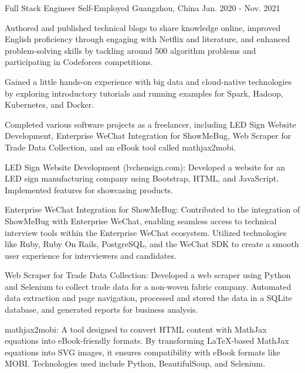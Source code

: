 \begin{cventries}
\cventry
{Full Stack Engineer} %
{Self-Employed} %
{Guangzhou, China} %
{Jan. 2020 - Nov. 2021} %
{
  \begin{cvitems} %
    \item {Authored and published technical blogs to share knowledge online, improved English proficiency through engaging with Netflix and literature, and enhanced problem-solving skills by tackling around 500 algorithm problems and participating in Codeforces competitions.}
    \item {Gained a little hands-on experience with big data and cloud-native technologies by exploring introductory tutorials and running examples for Spark, Hadoop, Kubernetes, and Docker.}
    \item {Completed various software projects as a freelancer, including LED Sign Website Development, Enterprise WeChat Integration for ShowMeBug, Web Scraper for Trade Data Collection, and an eBook tool called mathjax2mobi.}
    \item {LED Sign Website Development (lvchensign.com): Developed a website for an LED sign manufacturing company using Bootstrap, HTML, and JavaScript. Implemented features for showcasing products.}
    \item {Enterprise WeChat Integration for ShowMeBug: Contributed to the integration of ShowMeBug with Enterprise WeChat, enabling seamless access to technical interview tools within the Enterprise WeChat ecosystem. Utilized technologies like Ruby, Ruby On Rails, PostgreSQL, and the WeChat SDK to create a smooth user experience for interviewers and candidates.}
    \item {Web Scraper for Trade Data Collection: Developed a web scraper using Python and Selenium to collect trade data for a non-woven fabric company. Automated data extraction and page navigation, processed and stored the data in a SQLite database, and generated reports for business analysis.}
    \item {mathjax2mobi: A tool designed to convert HTML content with MathJax equations into eBook-friendly formats. By transforming LaTeX-based MathJax equations into SVG images, it ensures compatibility with eBook formats like MOBI. Technologies used include Python, BeautifulSoup, and Selenium.}
  \end{cvitems}
}


\end{cventries}
